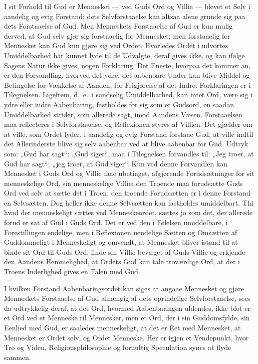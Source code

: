\documentclass[12pt]{book}
\begin{document}
I sit Forhold til Gud er Mennesket --- ved Guds Ord og Villie ---
blevet et Selv i aandelig og evig Forstand; dets Selvforstaaelse kan
altsaa alene grunde sig paa dets Forstaaelse af Gud. Men Menneskets
Forstaaelse af Gud er kun mulig derved, at Gud selv gjør sig
forstaaelig for Mennesket; men forstaaelig for Mennesket kan Gud kun
gjøre sig ved Ordet. Hvorledes Ordet i udvortes Umiddelbarhed har
kunnet lyde til de Udvalgte, deraf gives ikke, og kan ifølge Sagens
Natur ikke gives, nogen Forklaring. Det Eneste, hvorpaa det kommer
an, er den Forvandling, hvorved det ydre, det aabenbare Under kan
blive Middel og Betingelse for Vækkelse af
Aanden, for Frigjørelse af det Indre: Forklaringen er i
Tilegnelsen. Ligefrem, d.\ e.\ i sandselig Umiddelbarhed, kan intet
Ord, være sig i ydre eller indre Aabenbaring, fastholdes for sig som
et Gudsord, en saadan Umiddelbarhed strider, som allerede sagt,
imod Aandens Væsen. Forstaaelsen maa reflecteres i
Selvforstaaelse, og Reflexionen styres af Villien. Det gjælder om at
ville, som Ordet lyder, i aandelig og evig Forstand forstaae Gud, at
ville indtil det Allerinderste blive sig selv aabenbar ved at blive
aabenbar for Gud. Udtryk som: „Gud har sagt“; „Gud siger“, maa i
Tilegnelsen forvandles til: „Jeg troer, at Gud har sagt“; „jeg
troer, at Gud siger“. Kun ved denne Forvandlen kan Mennesket i Guds
Ord og Villie faae ubetinget, afgjørende Forudsætninger for sit
menneskelige Ord, sin menneskelige Villie: den Troende maa
forudsætte Guds Ord ved selv at sætte det i Troen; den troende
Forudsætten er i denne Forstand en Selvsætten. Dog heller ikke denne
Selvsætten kan fastholdes umiddelbart. Thi hvad der menneskeligt
sættes ved Menneskeordet, sættes jo som det, der allerede forud er
sat af Gud i Guds Ord. Det er ved den i Følelsen umiddelbare, i
Forestillingen endelige, men i Reflexionen uendelige Sætten og
Omsætten af Guddommeligt i Menneskeligt og omvendt, at Mennesket
bliver istand til at binde sit Ord til Guds Ord, finde sin Villie
bevæget af Guds Villie og erkjende den Aandens Hemmelighed, at
Ordets Gud kan tale troværdige Ord, at der i Troens Inderlighed
gives en Talen med Gud.

I hvilken Forstand Aabenbaringsordet kan siges at angaae Mennesket
og gjøre Menneskets Forstaaelse af Gud afhængig af dets oprindelige
Selvforstaaelse, sees da udtrykkelig deraf, at det Ord, hvormed
Aabenbaringen uldendes, ikke blot er et Ord ved et Menneske til
Mennesker, men et Ord, der i sin Guddomsfylde, sin Eenhed med Gud,
er saaledes menneskeligt, at det er Eet med
Mennesket, at Mennesket er Ordet selv, og Ordet Menneske. Her er
igjen et Vendepunkt, hvor Tro og Viden, Religionsphilosophie og
fornuftig Speculation synes at flyde sammen.
\end{document}
